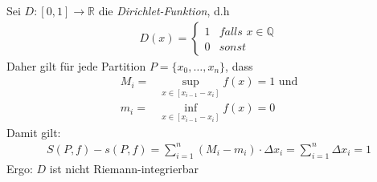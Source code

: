 \begin{Beispiel}{
	Sei $D:[0,1] \rightarrow \mathbb{R}$ die \emph{Dirichlet-Funktion}, d.h
	\begin{align*}
		D(x) = \begin{cases}
			1 & \textit{falls } x \in \mathbb{Q} \\
			0 & sonst
		\end{cases}
	\end{align*}
	Daher gilt für jede Partition $P = \{x_0, \hdots, x_n\}$, dass 
	\begin{align*}
		M_i = & \sup_{x \in [x_{i-1}-x_i]} f(x) = 1 \text{ und}\\
		m_i = & \inf_{x \in [x_{i-1}-x_i]} f(x) = 0
	\end{align*}
	Damit gilt:
	\begin{align*}
		S(P,f) - s(P,f) = \sum_{i = 1}^n (M_i - m_i) \cdot \Delta x_i 
		= \sum_{i = 1}^n \Delta x_i = 1
	\end{align*}
	Ergo: $D$ ist nicht Riemann-integrierbar
}\end{Beispiel}

